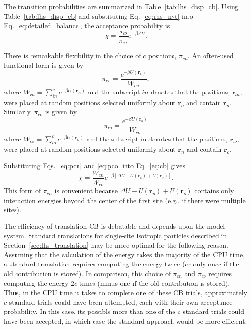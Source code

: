 \documentclass[
  9pt,
  bestpractices,
  pubversion,
]{livecoms}
\begin{document}
The transition probabilities are summarized in Table~\ref{tab:lhs_disp_cb}.
Using Table~\ref{tab:lhs_disp_cb} and substituting Eq.~\ref{eq:rhs_nvt} into Eq.~\ref{eq:detailed_balance}, the acceptance probability is
\begin{equation}
\chi = \frac{\pi_{co}}{\pi_{cn}}e^{-\beta \Delta U}.
\label{eq:cb}
\end{equation}

There is remarkable flexibility in the choice of $c$ positions, $\pi_{cn}$.
An often-used functional form is given by
\begin{equation}
\pi_{cn}=\frac{e^{-\beta U(\mathbf{r}_n)}}{W_{cn}},
\label{eq:pcn}
\end{equation}
where $W_{cn}=\sum_{in}^c e^{-\beta U(\mathbf{r}_{in})}$ and the subscript $in$ denotes that the positions, $\mathbf{r}_{in}$, were placed at random positions selected uniformly about $\mathbf{r}_o$ and contain $\mathbf{r}_n$.
Similarly, $\pi_{co}$ is given by
\begin{equation}
\pi_{co}=\frac{e^{-\beta U(\mathbf{r}_o)}}{W_{co}}
\label{eq:pco}
\end{equation}
where $W_{co}=\sum_{io}^c e^{-\beta U(\mathbf{r}_{io})}$ and the subscript $io$ denotes that the positions, $\mathbf{r}_{io}$, were placed at random positions selected uniformly about $\mathbf{r}_n$ and contain $\mathbf{r}_o$.

Substituting Eqs.~\ref{eq:pcn} and \ref{eq:pco} into Eq.~\ref{eq:cb} gives
\begin{equation}
\chi = \frac{W_{cn}}{W_{co}}e^{-\beta[\Delta U - U(\mathbf{r}_n) + U(\mathbf{r}_o)]}.
\end{equation}
This form of $\pi_{cn}$ is convenient because $\Delta U - U(\mathbf{r}_n) + U(\mathbf{r}_o)$ contains only interaction energies beyond the center of the first site (e.g., if there were multiple sites).

The efficiency of translation CB is debatable and depends upon the model system.
Standard translations for single-site isotropic particles described in Section~\ref{sec:lhs_translation} may be more optimal for the following reason.
Assuming that the calculation of the energy takes the majority of the CPU time, a standard translation requires computing the energy twice (or only once if the old contribution is stored).
In comparison, this choice of $\pi_{cn}$ and $\pi_{co}$ requires computing the energy $2c$ times (minus one if the old contribution is stored).
Thus, in the CPU time it takes to complete one of these CB trials, approximately $c$ standard trials could have been attempted, each with their own acceptance probability.
In this case, its possible more than one of the $c$ standard trials could have been accepted, in which case the standard approach would be more efficient.
\end{document}
